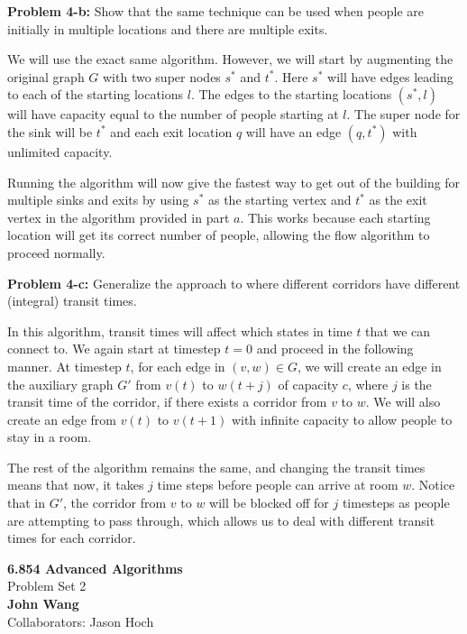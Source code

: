 \documentclass[psamsfonts]{amsart}
\newenvironment{sol}{\vspace{0.25cm}{\large \bfseries Solution:}}{\qedsymbol}
\newenvironment{prob}[1]{\begin{framed}{\large \bfseries Problem #1:}}{\end{framed}}
\newcommand{\makenewtitle}{
    \begin{center}
    {\huge \bfseries 6.854 Advanced Algorithms} \\
    Problem Set 2\\
    \vspace{0.25cm}
    {\bfseries John Wang} \\
    Collaborators: Jason Hoch
    \end{center}
    \vspace{0.5cm}
}
\begin{document}
\begin{prob}{4-b}
Show that the same technique can be used when people are initially in multiple locations and there are multiple exits.
\end{prob}
\begin{sol}
We will use the exact same algorithm. However, we will start by augmenting the original graph $G$ with two super nodes $s^*$ and $t^*$. Here $s^*$ will have edges leading to each of the starting locations $l$. The edges to the starting locations $(s^*, l)$ will have capacity equal to the number of people starting at $l$. The super node for the sink will be $t^*$ and each exit location $q$ will have an edge $(q, t^*)$ with unlimited capacity.

Running the algorithm will now give the fastest way to get out of the building for multiple sinks and exits by using $s^*$ as the starting vertex and $t^*$ as the exit vertex in the algorithm provided in part $a$. This works because each starting location will get its correct number of people, allowing the flow algorithm to proceed normally.
\end{sol}

\begin{prob}{4-c}
Generalize the approach to where different corridors have different (integral) transit times.
\end{prob}
\begin{sol}
In this algorithm, transit times will affect which states in time $t$ that we can connect to. We again start at timestep $t=0$ and proceed in the following manner. At timestep $t$, for each edge in $(v,w) \in G$, we will create an edge in the auxiliary graph $G'$ from $v(t)$ to $w(t+j)$ of capacity $c$, where $j$ is the transit time of the corridor, if there exists a corridor from $v$ to $w$. We will also create an edge from $v(t)$ to $v(t+1)$ with infinite capacity to allow people to stay in a room.

The rest of the algorithm remains the same, and changing the transit times means that now, it takes $j$ time steps before people can arrive at room $w$. Notice that in $G'$, the corridor from $v$ to $w$ will be blocked off for $j$ timesteps as people are attempting to pass through, which allows us to deal with different transit times for each corridor. 
\end{sol}

\newpage
\makenewtitle
\end{document}
